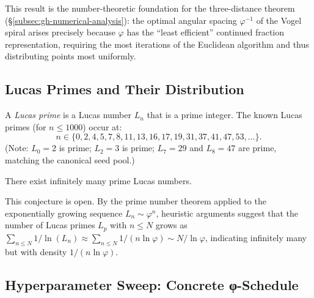 \noindent This result is the number-theoretic foundation for the
three-distance theorem (\S\ref{subsec:gh-numerical-analysis}):
the optimal angular spacing \(\varphi^{-1}\) of the Vogel spiral
arises precisely because \(\varphi\) has the ``least efficient''
continued fraction representation, requiring the most iterations
of the Euclidean algorithm and thus distributing points most uniformly.

\subsection{Lucas Primes and Their Distribution}
\label{subsec:gh-lucas-primes}

A \emph{Lucas prime} is a Lucas number \(L_n\) that is a prime integer.
The known Lucas primes (for \(n \leq 1000\)) occur at:
\[
  n \in \{0, 2, 4, 5, 7, 8, 11, 13, 16, 17, 19, 31, 37, 41, 47, 53, \ldots\}.
\]
(Note: \(L_0 = 2\) is prime; \(L_2 = 3\) is prime;
\(L_7 = 29\) and \(L_8 = 47\) are prime, matching the canonical
seed pool.)

\begin{conjecture}
\label{conj:gh-lucas-primes}
There exist infinitely many prime Lucas numbers.
\end{conjecture}

This conjecture is open.  By the prime number theorem applied to
the exponentially growing sequence \(L_n \sim \varphi^n\),
heuristic arguments suggest that the number of Lucas primes
\(L_p\) with \(n \leq N\) grows as
\(\sum_{n \leq N} 1/\ln(L_n) \approx \sum_{n \leq N} 1/(n \ln\varphi) \sim N/\ln\varphi\),
indicating infinitely many but with density \(1/(n\ln\varphi)\).

\subsection{Hyperparameter Sweep: Concrete φ-Schedule}
\label{subsec:gh-concrete-schedule}

